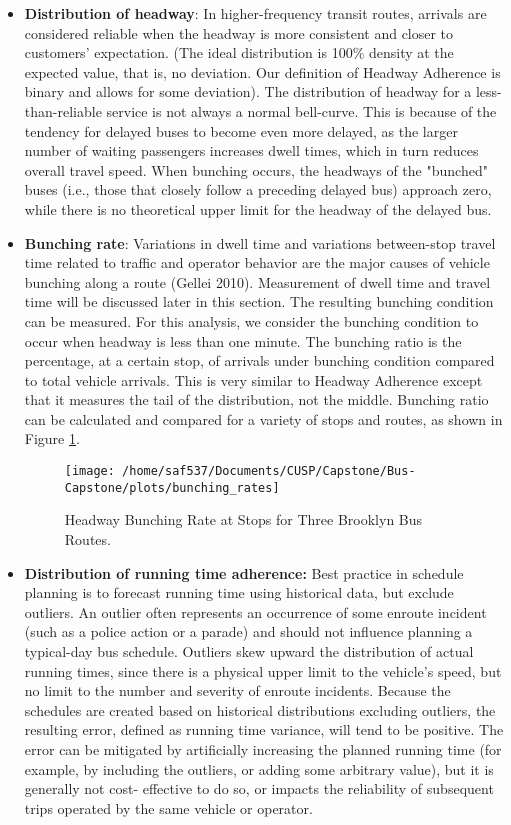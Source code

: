 \documentclass[12pt]{report}
\begin{document}
\begin{itemize}
\item \textbf{Distribution of headway}: In higher-frequency transit routes, arrivals are considered reliable when the headway is more consistent and closer to customers' expectation.  (The ideal distribution is 100\% density at the expected value, that is, no deviation.  Our definition of Headway Adherence is binary and allows for some deviation).  The distribution of headway for a less-than-reliable service is not always a normal bell-curve.  This is because of the tendency for delayed buses to become even more delayed, as the larger number of waiting passengers increases dwell times, which in turn reduces overall travel speed.  When bunching occurs, the headways of the "bunched" buses (i.e., those that closely follow a preceding delayed bus) approach zero, while there is no theoretical upper limit for the headway of the delayed bus.
\item \textbf{Bunching rate}: Variations in dwell time and variations between-stop travel time related to traffic and operator behavior are the major causes of vehicle bunching along a route (Gellei 2010).  Measurement of dwell time and travel time will be discussed later in this section.  The resulting bunching condition can be measured.  For this analysis, we consider the bunching condition to occur when headway is less than one minute.  The bunching ratio is the percentage, at a certain stop, of arrivals under bunching condition compared to total vehicle arrivals.  This is very similar to Headway Adherence except that it measures the tail of the distribution, not the middle.  Bunching ratio can be calculated and compared for a variety of stops and routes, as shown in Figure \ref{bunch}.


\begin{figure}[!ht]
  \caption{Headway Bunching Rate at Stops for Three Brooklyn Bus Routes.}
  \label{bunch}
  \centering
    \texttt{[image: /home/saf537/Documents/CUSP/Capstone/Bus-Capstone/plots/bunching\_rates]}
\end{figure}



\item \textbf{Distribution of running time adherence:} Best practice in schedule planning is to forecast running time using historical data, but exclude outliers. An outlier often represents an occurrence of some enroute incident (such as a police action or a parade) and should not influence planning a typical-day bus schedule. Outliers skew upward the distribution of actual running times, since there is a physical upper limit to the vehicle's speed, but no limit to the number and severity of enroute incidents. Because the schedules are created based on historical distributions excluding outliers, the resulting error, defined as running time variance, will tend to be positive. The error can be mitigated by artificially increasing the planned running time (for example, by including the outliers, or adding some arbitrary value), but it is generally not cost- effective to do so, or impacts the reliability of subsequent trips operated by the same vehicle or operator.



\end{itemize}
\end{document}
